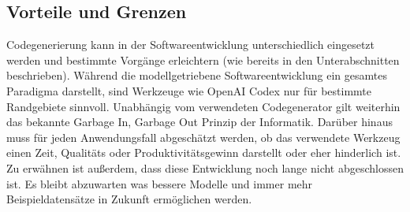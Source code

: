 \subsection{Vorteile und Grenzen}
Codegenerierung kann in der Softwareentwicklung unterschiedlich eingesetzt werden und bestimmte Vorgänge erleichtern (wie bereits in den Unterabschnitten beschrieben). Während die modellgetriebene Softwareentwicklung ein gesamtes Paradigma darstellt, sind Werkzeuge wie OpenAI Codex nur für bestimmte Randgebiete sinnvoll. Unabhängig vom verwendeten Codegenerator gilt weiterhin das bekannte Garbage In, Garbage Out Prinzip der Informatik. Darüber hinaus muss für jeden Anwendungsfall abgeschätzt werden, ob das verwendete Werkzeug einen Zeit, Qualitäts oder Produktivitätsgewinn darstellt oder eher hinderlich ist. Zu erwähnen ist außerdem, dass diese Entwicklung noch lange nicht abgeschlossen ist. Es bleibt abzuwarten was bessere Modelle und immer mehr Beispieldatensätze in Zukunft ermöglichen werden.
